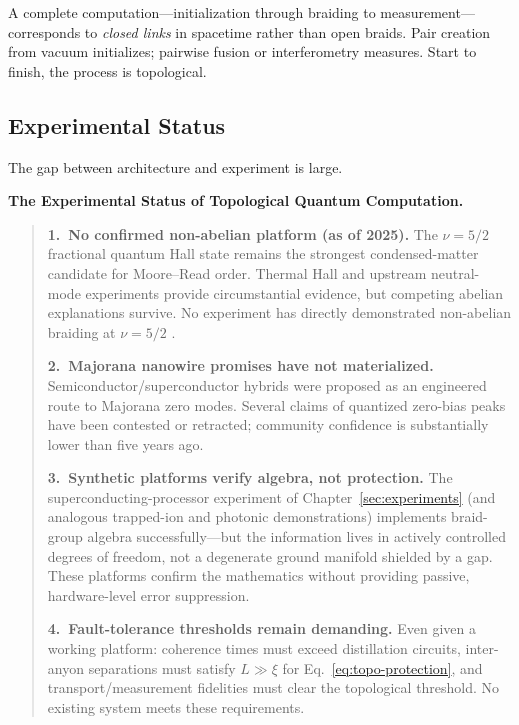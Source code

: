 A complete computation---initialization through braiding to measurement---corresponds to \emph{closed links} in spacetime rather than open braids.  Pair creation from vacuum initializes; pairwise fusion or interferometry measures.  Start to finish, the process is topological.

\subsection{Experimental Status}
\label{subsec:tqc-experimental-status}

The gap between architecture and experiment is large.

\medskip
\noindent\textbf{The Experimental Status of Topological
Quantum Computation.}
\begin{quote}
\textbf{1.\ No confirmed non-abelian platform (as of 2025).}  The $\nu = 5/2$ fractional quantum Hall state remains the strongest condensed-matter candidate for Moore--Read order.  Thermal Hall and upstream neutral-mode experiments provide circumstantial evidence, but competing abelian explanations survive.  No experiment has directly demonstrated non-abelian braiding at $\nu = 5/2$ \cite{NayakSimonSternFreedmanDasSarma2008NonabelianAnyons}.

\textbf{2.\ Majorana nanowire promises have not materialized.}  Semiconductor/superconductor hybrids were proposed as an engineered route to Majorana zero modes.  Several claims of quantized zero-bias peaks have been contested or retracted; community confidence is substantially lower than five years ago.

\textbf{3.\ Synthetic platforms verify algebra, not protection.}  The superconducting-processor experiment of Chapter~\ref{sec:experiments} (and analogous trapped-ion and photonic demonstrations) implements braid-group algebra successfully---but the information lives in actively controlled degrees of freedom, not a degenerate ground manifold shielded by a gap.  These platforms confirm the mathematics without providing passive, hardware-level error suppression.

\textbf{4.\ Fault-tolerance thresholds remain demanding.}  Even given a working platform: coherence times must exceed distillation circuits, inter-anyon separations must satisfy $L \gg \xi$ for Eq.~\eqref{eq:topo-protection}, and transport/measurement fidelities must clear the topological threshold.  No existing system meets these requirements.
\end{quote}
\medskip

